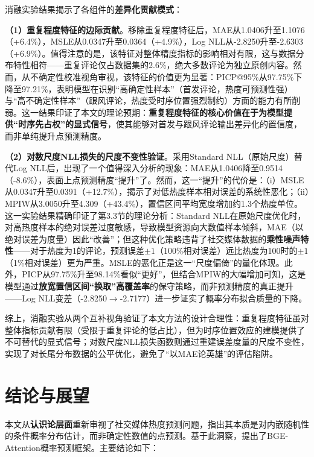 \documentclass[10pt]{article}
\begin{document}
消融实验结果揭示了各组件的\textbf{差异化贡献模式}：

\textbf{（1）重复程度特征的边际贡献}。移除重复程度特征后，MAE从1.0406升至1.1076（+6.4\%），MSLE从0.0347升至0.0364（+4.9\%），Log NLL从-2.8250升至-2.6303（+6.9\%）。值得注意的是，该特征对整体精度指标的影响相对有限，这与数据分布特性相符——重复评论仅占数据集的2.6\%，绝大多数评论为独立原创内容。然而，从不确定性校准视角审视，该特征的价值更为显著：PICP@95\%从97.75\%下降至97.21\%，表明模型在识别``高确定性样本''（首发评论，热度可预测性强）与``高不确定性样本''（跟风评论，热度受时序位置强烈制约）方面的能力有所削弱。这一结果印证了本文的理论预期：\textbf{重复程度特征的核心价值在于为模型提供``时序先占权''的显式信号}，使其能够对首发与跟风评论输出差异化的置信度，而非单纯提升点预测精度。

\textbf{（2）对数尺度NLL损失的尺度不变性验证}。采用Standard NLL（原始尺度）替代Log NLL后，出现了一个值得深入分析的现象：MAE从1.0406降至0.9514（-8.6\%），表面上点预测精度``提升''了。然而，这一``提升''的代价是：（i）MSLE从0.0347升至0.0391（+12.7\%），揭示了对低热度样本相对误差的系统性恶化；（ii）MPIW从3.0050升至4.309（+43.4\%），置信区间平均宽度增加约1.3个热度单位。这一实验结果精确印证了第3.3节的理论分析：Standard NLL在原始尺度优化时，对高热度样本的绝对误差过度敏感，导致模型资源向大数值样本倾斜，MAE（以绝对误差为度量）因此``改善''；但这种优化策略违背了社交媒体数据的\textbf{乘性噪声特性}——对于热度为1的评论，预测误差$\pm 1$（100\%相对误差）远比热度为100时的$\pm 1$（1\%相对误差）更为严重。MSLE的恶化正是这一``尺度偏倚''的量化体现。此外，PICP从97.75\%升至98.14\%看似``更好''，但结合MPIW的大幅增加可知，这是模型通过\textbf{放宽置信区间``换取''高覆盖率}的保守策略，而非预测精度的真正提升——Log NLL变差（-2.8250$\to$-2.7177）进一步证实了概率分布拟合质量的下降。

综上，消融实验从两个互补视角验证了本文方法的设计合理性：重复程度特征虽对整体指标贡献有限（受限于重复评论的低占比），但为时序位置效应的建模提供了不可替代的显式信号；对数尺度NLL损失函数则通过重建误差度量的尺度不变性，实现了对长尾分布数据的公平优化，避免了``以MAE论英雄''的评估陷阱。

\section{结论与展望}

本文从\textbf{认识论层面}重新审视了社交媒体热度预测问题，指出其本质是对内嵌随机性的条件概率分布估计，而非确定性数值的点预测。基于此洞察，提出了BGE-Attention概率预测框架。主要结论如下：
\end{document}
